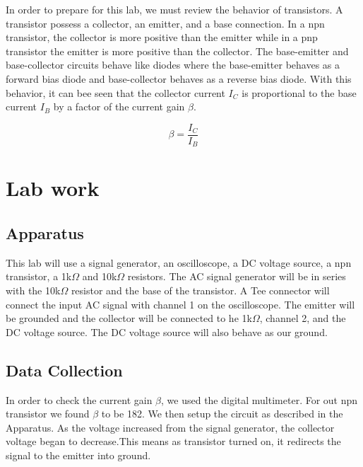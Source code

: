 \documentclass[11pt,letterpaper,onecolumn]{article}
\begin{document}
In order to prepare for this lab, we must review the behavior of transistors. A transistor possess a collector, an emitter, and a base connection. In a npn transistor, the collector is more positive than the emitter while in a pnp transistor the emitter is more positive than the collector. The base-emitter and base-collector circuits behave like diodes where the base-emitter behaves as a forward bias diode and base-collector behaves as a reverse bias diode. With this behavior, it can bee seen that the collector current $I_C$ is proportional to the base current $I_B$ by a factor of the current gain $\beta$.

$$\beta=\frac{I_C}{I_B}$$

\section{Lab work}

\subsection{Apparatus}

This lab will use a signal generator, an oscilloscope, a DC voltage source, a npn transistor, a 1k$\Omega$ and 10k$\Omega$ resistors. The AC signal generator will be in series with the 10k$\Omega$ resistor and the base of the transistor. A Tee connector will connect the input AC signal with channel 1 on the oscilloscope. The emitter will be grounded and the collector will be connected to he 1k$\Omega$, channel 2, and the DC voltage source. The DC voltage source will also behave as our ground. 

\subsection{Data Collection}

In order to check the current gain $\beta$, we used the digital multimeter. For out npn transistor we found $\beta$ to be 182. We then setup the circuit as described in the Apparatus. As the voltage increased from the signal generator, the collector voltage began to decrease.This means as transistor turned on, it redirects the signal to the emitter into ground.  
\end{document}
